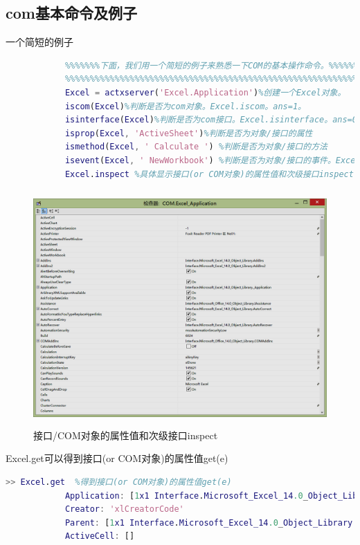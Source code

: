             \subsection{com基本命令及例子}
            一个简短的例子
            \begin{lstlisting}[language=Matlab]
            %%%%%%%%%%%%%%%%%%%%%%%%%%%%%%%%%%%%%%%%%%%%%%%%%%%%%%%%%%%%%%%%%%%%%%
            %%%%%%%下面，我们用一个简短的例子来熟悉一下COM的基本操作命令。%%%%%%%%
            %%%%%%%%%%%%%%%%%%%%%%%%%%%%%%%%%%%%%%%%%%%%%%%%%%%%%%%%%%%%%%%%%%%%%%
            Excel = actxserver('Excel.Application')%创建一个Excel对象。
            iscom(Excel)%判断是否为com对象。Excel.iscom。ans=1。
            isinterface(Excel)%判断是否为com接口。Excel.isinterface。ans=0。
            isprop(Excel, 'ActiveSheet')%判断是否为对象/接口的属性
            ismethod(Excel, ' Calculate ') %判断是否为对象/接口的方法
            isevent(Excel, ' NewWorkbook') %判断是否为对象/接口的事件。Excel.isevent
            Excel.inspect %具体显示接口(or COM对象)的属性值和次级接口inspect(e)如下图所示。
            \end{lstlisting}
            \begin{figure}[H]
            \centering
            \includegraphics[height=9cm]{images/Link_4.jpg}
            \caption{接口/COM对象的属性值和次级接口inspect}
            \label{fig:Link_4}
            \end{figure}
            Excel.get可以得到接口(or COM对象)的属性值get(e)
            \begin{lstlisting}[language=Matlab]
            >> Excel.get  %得到接口(or COM对象)的属性值get(e)
            Application: [1x1 Interface.Microsoft_Excel_14.0_Object_Library._Application]
            Creator: 'xlCreatorCode'
            Parent: [1x1 Interface.Microsoft_Excel_14.0_Object_Library._Application]
            ActiveCell: []
            \end{lstlisting}
